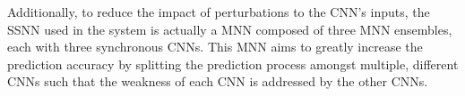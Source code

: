 Additionally, to reduce the impact of perturbations to the \ac{CNN}'s inputs, the \ac{SSNN} used in the system is actually a \ac{MNN} composed of three \ac{MNN} ensembles, each with three synchronous \acp{CNN}.
This \ac{MNN} aims to greatly increase the prediction accuracy by splitting the prediction process amongst multiple, different \acp{CNN} such that the weakness of each \ac{CNN} is addressed by the other \acp{CNN}.















